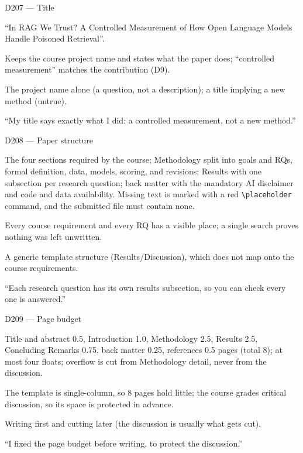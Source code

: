 \documentclass[11pt,a4paper]{report}
\begin{document}
\begin{decisionbox}{D207 --- Title}
\begin{description}[nosep, leftmargin=0pt]
  \item[Decision.] ``In RAG We Trust? A Controlled Measurement of How Open Language Models Handle Poisoned Retrieval''.
  \item[Why.] Keeps the course project name and states what the paper does; ``controlled measurement'' matches the contribution (D9).
  \item[Alternatives.] The project name alone (a question, not a description); a title implying a new method (untrue).
  \item[Interview line.] ``My title says exactly what I did: a controlled measurement, not a new method.''
\end{description}
\end{decisionbox}

\begin{decisionbox}{D208 --- Paper structure}
\begin{description}[nosep, leftmargin=0pt]
  \item[Decision.] The four sections required by the course; Methodology split into goals and RQs, formal definition, data, models, scoring, and revisions; Results with one subsection per research question; back matter with the mandatory AI disclaimer and code and data availability. Missing text is marked with a red \texttt{\textbackslash placeholder} command, and the submitted file must contain none.
  \item[Why.] Every course requirement and every RQ has a visible place; a single search proves nothing was left unwritten.
  \item[Alternatives.] A generic template structure (Results/Discussion), which does not map onto the course requirements.
  \item[Interview line.] ``Each research question has its own results subsection, so you can check every one is answered.''
\end{description}
\end{decisionbox}

\begin{decisionbox}{D209 --- Page budget}
\begin{description}[nosep, leftmargin=0pt]
  \item[Decision.] Title and abstract 0.5, Introduction 1.0, Methodology 2.5, Results 2.5, Concluding Remarks 0.75, back matter 0.25, references 0.5 pages (total 8); at most four floats; overflow is cut from Methodology detail, never from the discussion.
  \item[Why.] The template is single-column, so 8 pages hold little; the course grades critical discussion, so its space is protected in advance.
  \item[Alternatives.] Writing first and cutting later (the discussion is usually what gets cut).
  \item[Interview line.] ``I fixed the page budget before writing, to protect the discussion.''
\end{description}
\end{decisionbox}
\end{document}
